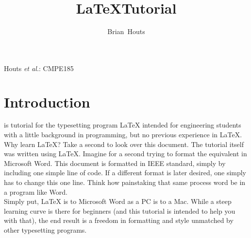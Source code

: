 \documentclass[12pt,journal,compsoc]{IEEEtran}
\begin{document}
\title{\LaTeX \hspace{1.5mm}Tutorial}
\author{Brian~Houts}
\date{}		%

%
{Houts \MakeLowercase{\textit{et al.}}: CMPE185}


\maketitle
\tableofcontents
\newpage


\section{Introduction}

 is tutorial for the typesetting program \LaTeX \hspace{.75mm} intended for engineering students with a little background in programming, but no previous experience in \LaTeX. \\
\indent Why learn \LaTeX? Take a second to look over this document. The tutorial itself was written using \LaTeX. Imagine for a second trying to format the equivalent in Microsoft Word. This document is formatted in IEEE standard, simply by including one simple line of code. If a different format is later desired, one simply has to change this one line. Think how painstaking that same process word be in a program like Word. \\
\indent Simply put, \LaTeX \hspace{.75mm} is to Microsoft Word as a PC is to a Mac. While a steep learning curve is there for beginners (and this tutorial is intended to help you with that), the end result is a freedom in formatting and style unmatched by other typesetting programs.
 
\end{document}
